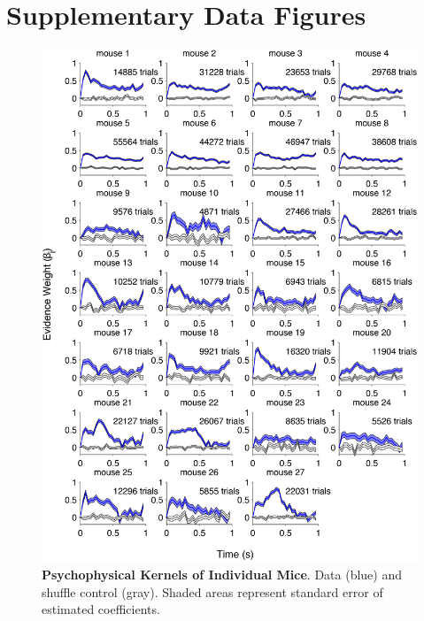 \chapter{Supplementary Data Figures} %

\label{AppendixB} 

\begin{figure}
  \centering
  	\includegraphics[width=\textwidth,height=\textheight,keepaspectratio]{Figures/chapter2/psychKernel_individualmice.png}
  \caption[Psychophysical Kernels of Individual Mice]{\textbf{Psychophysical Kernels of Individual Mice}. Data (blue) and shuffle control (gray). Shaded areas represent standard error of estimated coefficients.}
   \label{fig:allkernels2}
\end{figure}

